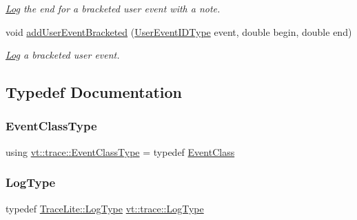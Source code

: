 \begin{DoxyCompactItemize}
\begin{DoxyCompactList}\small\item\em \hyperlink{structvt_1_1trace_1_1_log}{Log} the end for a bracketed user event with a note. \end{DoxyCompactList}\item 
void \hyperlink{namespacevt_1_1trace_ab090a5c9eae800c6820c88b3fe56c9c8}{add\+User\+Event\+Bracketed} (\hyperlink{namespacevt_1_1trace_a5908920d051c144c89f17c69ed262350}{User\+Event\+I\+D\+Type} event, double begin, double end)
\begin{DoxyCompactList}\small\item\em \hyperlink{structvt_1_1trace_1_1_log}{Log} a bracketed user event. \end{DoxyCompactList}\end{DoxyCompactItemize}


\subsection{Typedef Documentation}
\mbox{\label{namespacevt_1_1trace_afc5456ac95b0d3e9bb63a21597f5660c}} 
\subsubsection{\texorpdfstring{Event\+Class\+Type}{EventClassType}}
{\footnotesize\ttfamily using \hyperlink{namespacevt_1_1trace_afc5456ac95b0d3e9bb63a21597f5660c}{vt\+::trace\+::\+Event\+Class\+Type} = typedef \hyperlink{structvt_1_1trace_1_1_event_class}{Event\+Class}}

\mbox{\label{namespacevt_1_1trace_a6e7b7f2c6cb0a14d5b01dde877174a71}} 
\subsubsection{\texorpdfstring{Log\+Type}{LogType}}
{\footnotesize\ttfamily typedef \hyperlink{structvt_1_1trace_1_1_trace_lite_aeb73e523d31829d3163c877b145afa2a}{Trace\+Lite\+::\+Log\+Type} \hyperlink{namespacevt_1_1trace_a6e7b7f2c6cb0a14d5b01dde877174a71}{vt\+::trace\+::\+Log\+Type}}

\mbox{\label{namespacevt_1_1trace_a352c8799ee88afa3f1b7008952ed8485}} 
